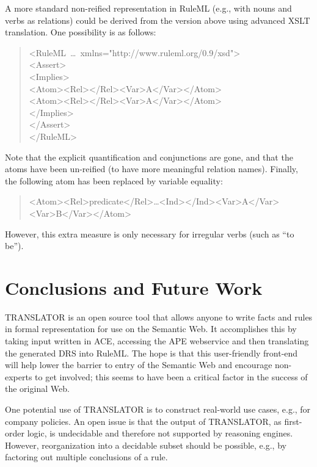 \documentclass[12pt]{article}
\begin{document}
A more standard non-reified representation in RuleML (e.g., with nouns and verbs as relations) could be derived from the version above using advanced XSLT translation. One possibility is as follows:
\begin{quote}
\small
\ttfamily
\setlength{\parindent}{0.1in}
<RuleML~\ldots~xmlns="http://www.ruleml.org/0.9/xsd">\\
\indent <Assert>\\
\indent \indent <Implies>\\
\indent \indent \indent <Atom><Rel></Rel><Var>A</Var></Atom>\\
\indent \indent \indent <Atom><Rel></Rel><Var>A</Var></Atom>\\
\indent \indent </Implies>\\
\indent </Assert>\\
</RuleML>
\setlength{\parindent}{0.0in}
\normalfont
\end{quote}
Note that the explicit quantification and conjunctions are gone, and that the atoms have been un-reified (to have more meaningful relation names). Finally, the following atom has been replaced by variable equality:
\begin{quote}
\small
\ttfamily
<Atom><Rel>predicate</Rel>\ldots<Ind></Ind><Var>A</Var><Var>B</Var></Atom>
\normalfont
\end{quote}
However, this extra measure is only necessary for irregular verbs (such as ``to be'').

\section{Conclusions and Future Work}
TRANSLATOR is an open source tool that allows anyone to write facts and rules in formal representation for use on the Semantic Web. It accomplishes this by taking input written in ACE, accessing the APE webservice and then translating the generated DRS into RuleML. The hope is that this user-friendly front-end will help lower the barrier to entry of the Semantic Web and encourage non-experts to get involved; this seems to have been a critical factor in the success of the original Web.

One potential use of TRANSLATOR is to construct real-world use cases, e.g., for company policies. An open issue is that the output of TRANSLATOR, as first-order logic, is undecidable and therefore not supported by reasoning engines. However, reorganization into a decidable subset should be possible, e.g., by factoring out multiple conclusions of a rule.
\end{document}
